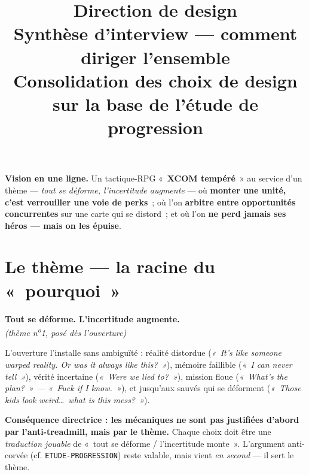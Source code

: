 \documentclass[11pt,a4paper]{article}
\title{\vspace{-1.5em}\textbf{\color{ink}\Huge Direction de design}\\[0.3em]
\large\color{accent}Synthèse d'interview --- comment diriger l'ensemble\\[0.2em]
\normalsize\color{ink}Consolidation des choix de design sur la base de l'étude de progression}
\author{}
\date{}
\begin{document}
\maketitle
\vspace{-3em}

\begin{visionbox}
\textbf{\color{ink}Vision en une ligne.} Un tactique-RPG «~\textbf{XCOM tempéré}~» au service d'un thème --- \emph{tout se déforme, l'incertitude augmente} --- où \textbf{monter une unité, c'est verrouiller une voie de perks}~; où l'on \textbf{arbitre entre opportunités concurrentes} sur une carte qui se distord~; et où l'on \textbf{ne perd jamais ses héros --- mais on les épuise}.
\end{visionbox}

\tableofcontents

\section{Le thème --- la racine du «~pourquoi~»}

\begin{tcolorbox}[enhanced,colback=themesoft,colframe=theme,boxrule=0.9pt,
  arc=3pt,left=10pt,right=10pt,top=7pt,bottom=7pt]
\centering\large\textbf{\color{theme}Tout se déforme. L'incertitude augmente.}\\
\normalsize\itshape (thème n\textsuperscript{o}1, posé dès l'ouverture)
\end{tcolorbox}

\noindent L'ouverture l'installe sans ambiguïté : réalité distordue (\textit{«~It's like someone warped reality. Or was it always like this?~»}), mémoire faillible (\textit{«~I can never tell~»}), vérité incertaine (\textit{«~Were we lied to?~»}), mission floue (\textit{«~What's the plan?~» --- «~Fuck if I know.~»}), et jusqu'aux sauvés qui se déforment (\textit{«~Those kids look weird\dots\ what is this mess?~»}).

\smallskip
\textbf{Conséquence directrice : les mécaniques ne sont pas justifiées d'abord par l'anti-treadmill, mais par le thème.} Chaque choix doit être une \emph{traduction jouable} de «~tout se déforme / l'incertitude monte~». L'argument anti-corvée (cf. \texttt{ETUDE-PROGRESSION}) reste valable, mais vient \emph{en second} --- il sert le thème.
\end{document}
